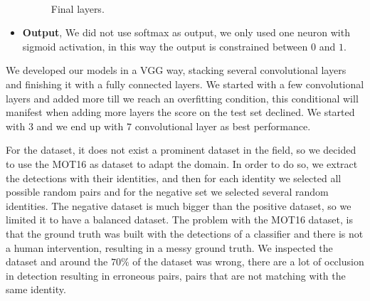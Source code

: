 \begin{itemize}
\begin{figure}[H]
\\



\caption{Final layers.}
\label{siameseData2}
\end{figure}


\item \textbf{Output}, We did not use softmax as output, we only used one neuron with sigmoid activation, in this way the output is constrained between $0$ and $1$.



\end{itemize}


We developed our models in a VGG way, stacking  several convolutional layers and finishing it with a fully connected layers. We started with a few convolutional layers and added more till we reach an overfitting condition, this conditional will manifest when adding more layers the score on the test set declined. We started with $3$ and we end up with $7$ convolutional layer as best performance.

For the dataset, it does not exist a prominent dataset in the field, so we decided to use the MOT16 as dataset to adapt the domain. In order to do so, we extract the detections with their identities, and then for each identity we selected all possible random pairs and for the negative set we selected several random identities. The negative dataset is much bigger than the positive dataset, so we limited it to have a balanced dataset. The problem with the MOT16 dataset, is that the ground truth was built with the detections of a classifier and there is not a human intervention, resulting in a messy ground truth. We inspected the dataset and around the $70 \%$ of the dataset was wrong, there are a lot of occlusion in detection resulting in erroneous pairs, pairs that are not matching with the same identity.

